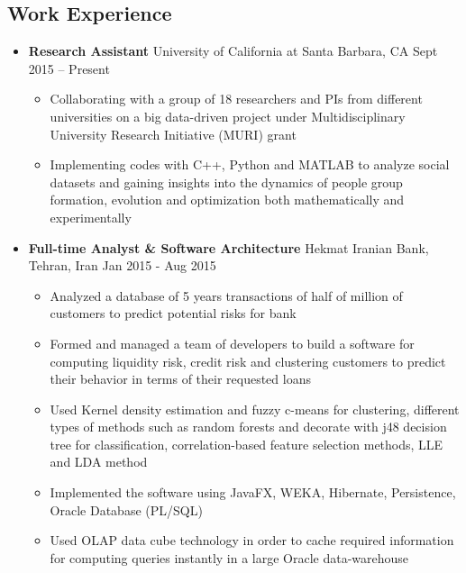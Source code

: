 \documentclass[letter]{res}
\begin{document}
\begin{resume}
		\section{Work Experience}
		\begin{itemize}[leftmargin=-.1in]
			\item \textbf{Research Assistant} \newline
			University of California at Santa Barbara, CA \hfill Sept 2015 – Present\\
			\vspace{-4mm}
			\iflong
			\begin{itemize}
				\item Collaborating with a group of 18 researchers and PIs from different universities on a big data-driven project under Multidisciplinary University Research Initiative (MURI) grant
				\item Implementing codes with C++, Python and MATLAB to analyze social datasets and gaining insights into the dynamics of people group formation, evolution and optimization both mathematically and experimentally
			\end{itemize}
			\fi
			
			\item \textbf{Full-time Analyst \& Software Architecture} \newline
			Hekmat Iranian Bank, Tehran, Iran \hfill Jan 2015 - Aug 2015\\
			\vspace{-4mm}
			\iflong
			\begin{itemize}
				\item Analyzed a database of 5 years transactions of half of million of customers to predict potential risks for bank
				\item Formed and managed a team of developers to build a software for computing liquidity risk, credit risk and clustering customers to predict their behavior in terms of their requested loans 
				\item Used Kernel density estimation and fuzzy c-means for clustering, different types of methods such as random forests and decorate with j48 decision tree for classification, correlation-based feature selection methods, LLE and LDA method
				\item Implemented the software using JavaFX, WEKA, Hibernate, Persistence, Oracle Database (PL/SQL)
				\item Used OLAP data cube technology in order to cache required information for computing queries instantly in a large Oracle data-warehouse
			\end{itemize}
			\fi
			

\end{itemize}
\end{resume}
\end{document}
